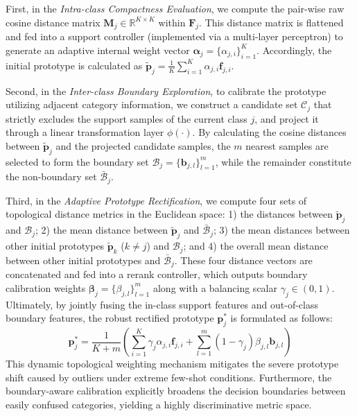 \documentclass[lettersize,journal]{IEEEtran}
\begin{document}
First, in the \textit{Intra-class Compactness Evaluation}, we compute the pair-wise raw cosine distance matrix $\mathbf{M}_j \in \mathbb{R}^{K \times K}$ within $\mathbf{F}_j$. 
This distance matrix is flattened and fed into a support controller (implemented via a multi-layer perceptron) to generate an adaptive internal weight vector $\boldsymbol{\alpha}_j = \{\alpha_{j,i}\}_{i=1}^K$. 
Accordingly, the initial prototype is calculated as $\tilde{\mathbf{p}}_j = \frac{1}{K}\sum_{i=1}^K \alpha_{j,i} \mathbf{f}_{j,i}$. 

Second, in the \textit{Inter-class Boundary Exploration}, to calibrate the prototype utilizing adjacent category information, we construct a candidate set $\mathcal{C}_j$ that strictly excludes the support samples of the current class $j$, and project it through a linear transformation layer $\phi(\cdot)$. 
By calculating the cosine distances between $\tilde{\mathbf{p}}_j$ and the projected candidate samples, the $m$ nearest samples are selected to form the boundary set $\mathcal{B}_j = \{\mathbf{b}_{j,l}\}_{l=1}^m$, while the remainder constitute the non-boundary set $\bar{\mathcal{B}}_j$. 

Third, in the \textit{Adaptive Prototype Rectification}, we compute four sets of topological distance metrics in the Euclidean space: 1) the distances between $\tilde{\mathbf{p}}_j$ and $\mathcal{B}_j$; 2) the mean distance between $\tilde{\mathbf{p}}_j$ and $\bar{\mathcal{B}}_j$; 3) the mean distances between other initial prototypes $\tilde{\mathbf{p}}_k$ ($k \neq j$) and $\mathcal{B}_j$; and 4) the overall mean distance between other initial prototypes and $\bar{\mathcal{B}}_j$. 
These four distance vectors are concatenated and fed into a rerank controller, which outputs boundary calibration weights $\boldsymbol{\beta}_j = \{\beta_{j,l}\}_{l=1}^m$ along with a balancing scalar $\gamma_j \in (0, 1)$. 
Ultimately, by jointly fusing the in-class support features and out-of-class boundary features, the robust rectified prototype $\mathbf{p}^*_j$ is formulated as follows:
\begin{equation}
\mathbf{p}^*_j = \frac{1}{K+m} \left( \sum_{i=1}^K \gamma_j \alpha_{j,i} \mathbf{f}_{j,i} + \sum_{l=1}^m (1 - \gamma_j) \beta_{j,l} \mathbf{b}_{j,l} \right)
\label{eq_apcm_prototype}
\end{equation}
This dynamic topological weighting mechanism mitigates the severe prototype shift caused by outliers under extreme few-shot conditions. 
Furthermore, the boundary-aware calibration explicitly broadens the decision boundaries between easily confused categories, yielding a highly discriminative metric space.
\end{document}
